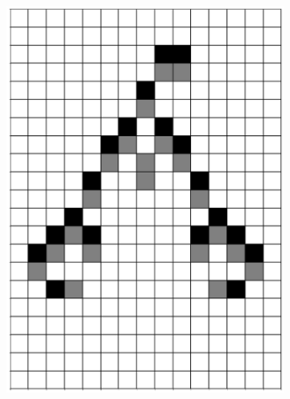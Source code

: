 \documentclass[12pt]{article}
\numberwithin{figure}{section} %
\begin{document}
\begin{figure}[H]
\begin{subfigure}{0.19\textwidth}
     		\includegraphics[width=\linewidth]{Section4/26.3}
     		\subcaption{}
   	\end{subfigure}
       	\begin{subfigure}{0.19\textwidth}
     		\centering

\end{subfigure}
\end{figure}
\end{document}
